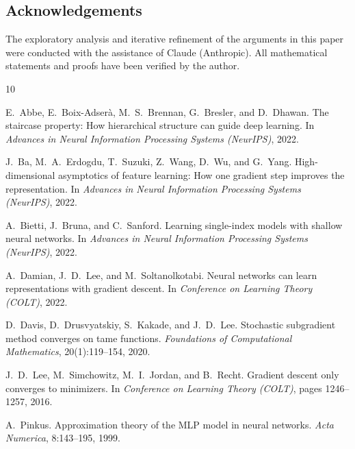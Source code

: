 \documentclass[11pt]{amsart}
\theoremstyle{definition}
\begin{document}
\subsection*{Acknowledgements}
The exploratory analysis and iterative refinement of the arguments in this
paper were conducted with the assistance of Claude (Anthropic).  All
mathematical statements and proofs have been verified by the author.

\begin{thebibliography}{10}

E.~Abbe, E.~Boix-Adser\`a, M.~S.~Brennan, G.~Bresler, and D.~Dhawan.
\newblock The staircase property: How hierarchical structure can guide deep learning.
\newblock In \emph{Advances in Neural Information Processing Systems (NeurIPS)}, 2022.

J.~Ba, M.~A.~Erdogdu, T.~Suzuki, Z.~Wang, D.~Wu, and G.~Yang.
\newblock High-dimensional asymptotics of feature learning: How one gradient step improves the representation.
\newblock In \emph{Advances in Neural Information Processing Systems (NeurIPS)}, 2022.

A.~Bietti, J.~Bruna, and C.~Sanford.
\newblock Learning single-index models with shallow neural networks.
\newblock In \emph{Advances in Neural Information Processing Systems (NeurIPS)}, 2022.

A.~Damian, J.~D.~Lee, and M.~Soltanolkotabi.
\newblock Neural networks can learn representations with gradient descent.
\newblock In \emph{Conference on Learning Theory (COLT)}, 2022.

D.~Davis, D.~Drusvyatskiy, S.~Kakade, and J.~D.~Lee.
\newblock Stochastic subgradient method converges on tame functions.
\newblock \emph{Foundations of Computational Mathematics}, 20(1):119--154, 2020.

J.~D.~Lee, M.~Simchowitz, M.~I.~Jordan, and B.~Recht.
\newblock Gradient descent only converges to minimizers.
\newblock In \emph{Conference on Learning Theory (COLT)}, pages 1246--1257, 2016.

A.~Pinkus.
\newblock Approximation theory of the MLP model in neural networks.
\newblock \emph{Acta Numerica}, 8:143--195, 1999.

\end{thebibliography}
\end{document}
